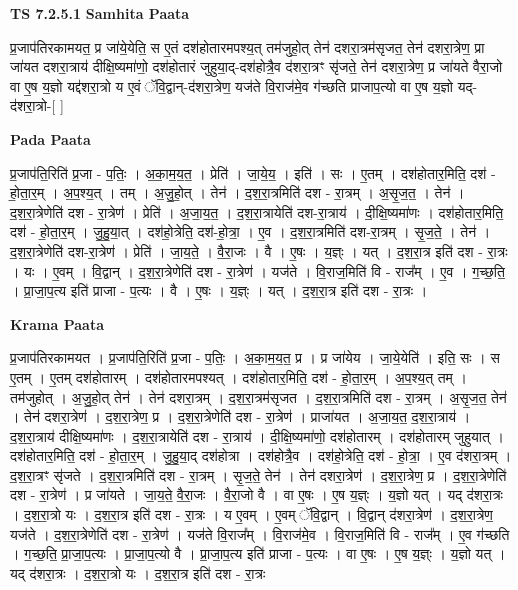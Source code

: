 \documentclass[17pt]{extarticle}
\begin{document}
\textbf{TS 7.2.5.1 } \newline
\textbf{Samhita Paata} \newline

प्र॒जाप॑तिरकामयत॒ प्र जा॑ये॒येति॒ स ए॒तं दश॑होतारमपश्य॒त् तम॑जुहो॒त् तेन॑ दशरा॒त्रम॑सृजत॒ तेन॑ दशरा॒त्रेण॒ प्रा जा॑यत दशरा॒त्राय॑ दीक्षि॒ष्यमा॑णो॒ दश॑होतारं जुहुया॒द्-दश॑होत्रै॒व द॑शरा॒त्रꣳ सृ॑जते॒ तेन॑ दशरा॒त्रेण॒ प्र जा॑यते वैरा॒जो वा ए॒ष य॒ज्ञो यद्द॑शरा॒त्रो य ए॒वं ॅवि॒द्वान्-द॑शरा॒त्रेण॒ यज॑ते वि॒राज॑मे॒व ग॑च्छति प्राजाप॒त्यो वा ए॒ष य॒ज्ञो यद्-द॑शरा॒त्रो-[  ] \newline

\textbf{Pada Paata} \newline

प्र॒जाप॑ति॒रिति॑ प्र॒जा - प॒तिः॒ । अ॒का॒म॒य॒त॒ । प्रेति॑ । जा॒ये॒य॒ । इति॑ । सः । ए॒तम् । दश॑होतार॒मिति॒ दश॑ - हो॒ता॒र॒म् । अ॒प॒श्य॒त् । तम् । अ॒जु॒हो॒त् । तेन॑ । द॒श॒रा॒त्रमिति॑ दश - रा॒त्रम् । अ॒सृ॒ज॒त॒ । तेन॑ । द॒श॒रा॒त्रेणेति॑ दश - रा॒त्रेण॑ । प्रेति॑ । अ॒जा॒य॒त॒ । द॒श॒रा॒त्रायेति॑ दश-रा॒त्राय॑ । दी॒क्षि॒ष्यमा॑णः । दश॑होतार॒मिति॒ दश॑ - हो॒ता॒र॒म् । जु॒हु॒या॒त् । दश॑हो॒त्रेति॒ दश॑-हो॒त्रा॒ । ए॒व । द॒श॒रा॒त्रमिति॑ दश-रा॒त्रम् । सृ॒ज॒ते॒ । तेन॑ । द॒श॒रा॒त्रेणेति॑ दश-रा॒त्रेण॑ । प्रेति॑ । जा॒य॒ते॒ । वै॒रा॒जः । वै । ए॒षः । य॒ज्ञ्ः । यत् । द॒श॒रा॒त्र इति॑ दश - रा॒त्रः । यः । ए॒वम् । वि॒द्वान् । द॒श॒रा॒त्रेणेति॑ दश - रा॒त्रेण॑ । यज॑ते । वि॒राज॒मिति॑ वि - राज᳚म् । ए॒व । ग॒च्छ॒ति॒ । प्रा॒जा॒प॒त्य इति॑ प्राजा - प॒त्यः । वै । ए॒षः । य॒ज्ञ्ः । यत् । द॒श॒रा॒त्र इति॑ दश - रा॒त्रः ।  \newline


\textbf{Krama Paata} \newline

प्र॒जाप॑तिरकामयत । प्र॒जाप॑ति॒रिति॑ प्र॒जा - प॒तिः॒ । अ॒का॒म॒य॒त॒ प्र । प्र जा॑येय । जा॒ये॒येति॑ । इति॒ सः । स ए॒तम् । ए॒तम् दश॑होतारम् । दश॑होतारमपश्यत् । दश॑होतार॒मिति॒ दश॑ - हो॒ता॒र॒म् । अ॒प॒श्य॒त् तम् । तम॑जुहोत् । अ॒जु॒हो॒त् तेन॑ । तेन॑ दशरा॒त्रम् । द॒श॒रा॒त्रम॑सृजत । द॒श॒रा॒त्रमिति॑ दश - रा॒त्रम् । अ॒सृ॒ज॒त॒ तेन॑ । तेन॑ दशरा॒त्रेण॑ । द॒श॒रा॒त्रेण॒ प्र । द॒श॒रा॒त्रेणेति॑ दश - रा॒त्रेण॑ । प्राजा॑यत । अ॒जा॒य॒त॒ द॒श॒रा॒त्राय॑ । द॒श॒रा॒त्राय॑ दीक्षि॒ष्यमा॑णः । द॒श॒रा॒त्रायेति॑ दश - रा॒त्राय॑ । दी॒क्षि॒ष्यमा॑णो॒ दश॑होतारम् । दश॑होतारम् जुहुयात् । दश॑होतार॒मिति॒ दश॑ - हो॒ता॒र॒म् । जु॒हु॒या॒द् दश॑होत्रा । दश॑होत्रै॒व । दश॑हो॒त्रेति॒ दश॑ - हो॒त्रा॒ । ए॒व द॑शरा॒त्रम् । द॒श॒रा॒त्रꣳ सृ॑जते । द॒श॒रा॒त्रमिति॑ दश - रा॒त्रम् । सृ॒ज॒ते॒ तेन॑ । तेन॑ दशरा॒त्रेण॑ । द॒श॒रा॒त्रेण॒ प्र । द॒श॒रा॒त्रेणेति॑ दश - रा॒त्रेण॑ । प्र जा॑यते । जा॒य॒ते॒ वै॒रा॒जः । वै॒रा॒जो वै । वा ए॒षः । ए॒ष य॒ज्ञ्ः । य॒ज्ञो यत् । यद् द॑शरा॒त्रः । द॒श॒रा॒त्रो यः । द॒श॒रा॒त्र इति॑ दश - रा॒त्रः । य ए॒वम् । ए॒वम् ॅवि॒द्वान् । वि॒द्वान् द॑शरा॒त्रेण॑ । द॒श॒रा॒त्रेण॒ यज॑ते । द॒श॒रा॒त्रेणेति॑ दश - रा॒त्रेण॑ । यज॑ते वि॒राज᳚म् । वि॒राज॑मे॒व । वि॒राज॒मिति॑ वि - राज᳚म् । ए॒व ग॑च्छति । ग॒च्छ॒ति॒ प्रा॒जा॒प॒त्यः । प्रा॒जा॒प॒त्यो वै । प्रा॒जा॒प॒त्य इति॑ प्राजा - प॒त्यः । वा ए॒षः । ए॒ष य॒ज्ञ्ः । य॒ज्ञो यत् । यद् द॑शरा॒त्रः । द॒श॒रा॒त्रो यः । द॒श॒रा॒त्र इति॑ दश - रा॒त्रः \newline
\end{document}
